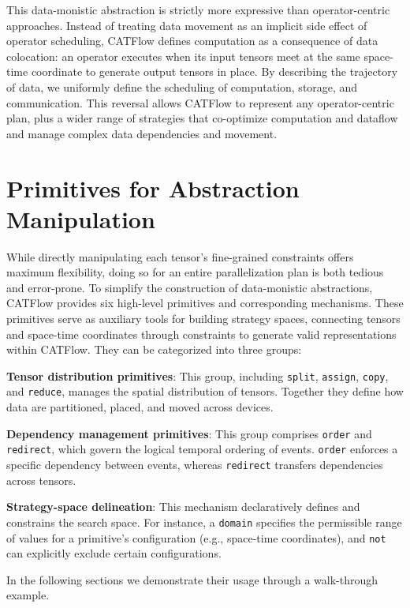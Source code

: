 \documentclass[letterpaper,twocolumn,10pt]{article}
\newcommand{\name}{CATFlow}
\begin{document}
This data-monistic abstraction is strictly more expressive than operator-centric approaches. Instead of treating data movement as an implicit side effect of operator scheduling, \name{} defines computation as a consequence of data colocation: an operator executes when its input tensors meet at the same space-time coordinate to generate output tensors in place. By describing the trajectory of data, we uniformly define the scheduling of computation, storage, and communication. This reversal allows \name{} to represent any operator-centric plan, plus a wider range of strategies that co-optimize computation and dataflow and manage complex data dependencies and movement.

\section{Primitives for Abstraction Manipulation}
\label{sec:primitives}
While directly manipulating each tensor's fine-grained constraints offers maximum flexibility, doing so for an entire parallelization plan is both tedious and error-prone. To simplify the construction of data-monistic abstractions, \name{} provides six high-level primitives and corresponding mechanisms. These primitives serve as auxiliary tools for building strategy spaces, connecting tensors and space-time coordinates through constraints to generate valid representations within \name{}. They can be categorized into three groups:

\textbf{Tensor distribution primitives}: This group, including \texttt{split}, \texttt{assign}, \texttt{copy}, and \texttt{reduce}, manages the spatial distribution of tensors. Together they define how data are partitioned, placed, and moved across devices.

\textbf{Dependency management primitives}: This group comprises \texttt{order} and \texttt{redirect}, which govern the logical temporal ordering of events. \texttt{order} enforces a specific dependency between events, whereas \texttt{redirect} transfers dependencies across tensors.

\textbf{Strategy-space delineation}: This mechanism declaratively defines and constrains the search space. For instance, a \texttt{domain} specifies the permissible range of values for a primitive's configuration (e.g., space-time coordinates), and \texttt{not} can explicitly exclude certain configurations.

In the following sections we demonstrate their usage through a walk-through example.
\end{document}
